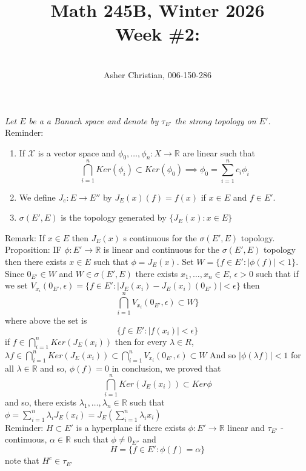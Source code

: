 \documentclass[11pt]{article}
\newcommand{\cnum}{Math 245B}
\newcommand{\ced}{Winter 2026}
\newcommand{\ctitle}[4]{\title{\vspace{-0.5in}\cnum, \ced\\Week #1: #2}\author{\vspace{-0.35in}\\#3, #4}}
\begin{document}
\ctitle{\#2}{}{Asher Christian}{006-150-286}
\date{}
\maketitle

\emph{
    Let $E$ be a a Banach space and denote by $\tau_{E'}$ the strong topology on  $ E'$.
}
Reminder: 
\begin{enumerate}
    \item If $ \mathcal{X}$ is a vector space and $\phi_0, \dots, \phi_n : X \rightarrow \mathbb{R}$ are linear
        such that 
         \[
             \bigcap_{i=1}^{n} Ker(\phi_i) \subset Ker(\phi_0) \implies \phi_0 = \sum_{i=1}^{n}c_i \phi_i
        \] 
    \item We define $J_e : E \rightarrow E''$ by $J_E(x)(f) = f(x)$ if $x \in E$ and  $f \in E'$.
    \item $\sigma(E', E)$ is the topology generated by $\{J_E(x) : x \in E\}$
\end{enumerate}
Remark: If $x \in E$ then  $J_E(x)$ s continuous for the  $\sigma(E',E)$ topology.
Proposition: IF  $\phi: E' \rightarrow \mathbb{R}$ is linear and continuous for the $\sigma(E', E)$ topology then
there exists $x \in E$ such that  $\phi = J_E(x)$.
Set $W = \{f \in E': |\phi(f)| < 1\}$. Since $0_{E'} \in W$ and  $W \in \sigma(E', E)$ there exists $x_1,\dots,x_n \in E$, $\epsilon > 0$ such that if
we set $V_{x_i}(0_{E'},\epsilon) = \{f \in E': |J_E(x_i) - J_E(x_i)(0_{E'})| < \epsilon\}$ then
\[
    \bigcap_{i=1}^{n}V_{x_i}(0_{E'},\epsilon) \subset W\}
\] 
where above the set is
\[
    \{f \in E' : |f(x_i)| < \epsilon\}
\] 
if $f \in \bigcap_{i=1}^{n}Ker(J_E(x_i))$ then for every $\lambda \in R$, $\lambda f \in \bigcap_{i=1}^{n}Ker(J_E(x_i)) \subset \bigcap_{i=1}^{n}V_{x_i}(0_{E'}, \epsilon) \subset W$
And so $|\phi(\lambda f)| < 1$  for all $\lambda \in \mathbb{R}$ and so, $\phi(f) = 0$ in conclusion, we proved that
\[
    \bigcap_{i=1}^{n}Ker(J_E(x_i)) \subset Ker \phi
\] 
and so, there exists  $\lambda_1,\dots,\lambda_n \in \mathbb{R}$ such that $\phi = \sum_{i=1}^{n}\lambda_i J_E(x_i) = J_E(\sum_{i=1}^{n}\lambda_i x_i)$\\
Reminder: $H \subset E'$ is a hyperplane  if there exists $\phi: E' \rightarrow \mathbb{R}$ linear and $\tau_{E'}$ -continuous,  $\alpha \in \mathbb{R}$
such that $\phi \ne 0_{E''}$  and
\[
    H = \{ f \in E' : \phi(f) = \alpha\}
\] 
note that $H^{c} \in \tau_{E'}$
 
\end{document}
